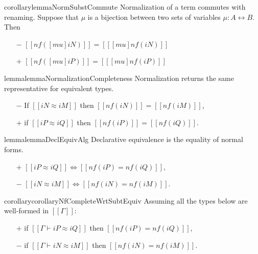 \begin{restatable}{corollary}{lemmaNormSubstCommute}
    \label{lemma:norm-subst-commute} 
    Normalization of a term commutes with renaming.
    Suppose that $\mu$ is a bijection between two sets of variables
    $\mu : A \leftrightarrow B$. Then
    \begin{itemize}
        \item[$-$] $[[nf([mu]iN)]] = [[ [mu] nf(iN) ]]$
        \item[$+$] $[[nf([mu]iP)]] = [[ [mu] nf(iP) ]]$
    \end{itemize}
\end{restatable}


\begin{restatable}{lemma}{lemmaNormalizationCompleteness}
    \label{lemma:normalization-completeness}
    Normalization returns the same representative for equivalent types.

    \begin{itemize}
        \item[$-$] If $[[iN ≈ iM]]$ then $[[nf(iN)]] = [[nf(iM)]]$,
        \item[$+$] if $[[iP ≈ iQ]]$ then $[[nf(iP)]] = [[nf(iQ)]]$.
    \end{itemize}
\end{restatable}

\begin{restatable}{lemma}{lemmaDeclEquivAlg}
    \label{lemma:decl-equiv-algorithmization}
    Declarative equivalence is the equality of normal forms. 
    \begin{itemize}
        \item[$+$] $[[iP ≈ iQ]] \iff [[nf(iP) = nf(iQ)]]$,
        \item[$-$] $[[iN ≈ iM]] \iff [[nf(iN) = nf(iM)]]$.
    \end{itemize}
\end{restatable}

\begin{restatable}{corollary}{corollaryNfCompleteWrtSubtEquiv}
    \label{corollary:nf-complete-wrt-subt-equiv}
    Assuming all the types below are well-formed in $[[Γ]]$:
    \begin{itemize}
        \item [$+$] if $[[Γ ⊢ iP ≈ iQ]]$ then $[[nf(iP) = nf(iQ)]]$,
        \item [$-$] if $[[Γ ⊢ iN ≈ iM]]$ then $[[nf(iN) = nf(iM)]]$.
    \end{itemize}
\end{restatable}  






